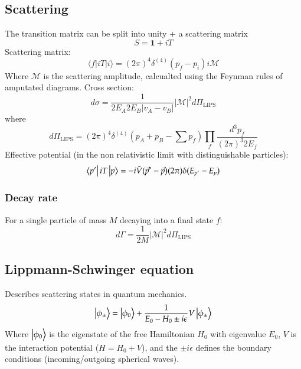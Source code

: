 \documentclass{article}
\begin{document}
\subsection{Scattering}
The transition matrix can be split into unity + a scattering matrix
\begin{equation}
    S = \boldsymbol{1} + iT
\end{equation}
Scattering matrix:
\begin{equation}
    \langle f | iT | i \rangle = (2\pi)^4 \delta^{(4)}(p_f - p_i) i\mathcal{M}
\end{equation}
Where $\mathcal{M}$ is the scattering amplitude, calcualted using the Feynman rules of amputated diagrams.
Cross section:
\begin{equation}
    d\sigma = \frac{1}{2E_A 2E_B |v_A - v_B|} |\mathcal{M}|^2 d\Pi_{\text{LIPS}}
\end{equation}
where
\begin{equation}
    d\Pi_{\text{LIPS}} = (2\pi)^4 \delta^{(4)}(p_A + p_B - \sum p_f) \prod_f \frac{d^3p_f}{(2\pi)^3 2E_f}
\end{equation}
Effective potential (in the non relativistic limit with distinguishable particles):
\begin{equation}
    \bra{p'}iT\ket{p} = -i \tilde{V}(\vec{p}' - \vec{p})(2\pi)\delta(E_{p'} - E_p)
\end{equation}
\subsubsection*{Decay rate}
For a single particle of mass $M$ decaying into a final state $f$:
\begin{equation}
    d\Gamma = \frac{1}{2M} |\mathcal{M}|^2 d\Pi_{\text{LIPS}}
\end{equation}

\subsection{Lippmann-Schwinger equation}
Describes scattering states in quantum mechanics.
\begin{equation}
    \ket{\phi_{\pm}} = \ket{\phi_0} + \frac{1}{E_0 - H_0 \pm i\epsilon}V\ket{\phi_{\pm}}
\end{equation}
Where $\ket{\phi_0}$ is the eigenstate of the free Hamiltonian $H_0$ with eigenvalue $E_0$, $V$ is the interaction potential ($H = H_0 + V$), and the $\pm i\epsilon$ defines the boundary conditions (incoming/outgoing spherical waves).
\end{document}
